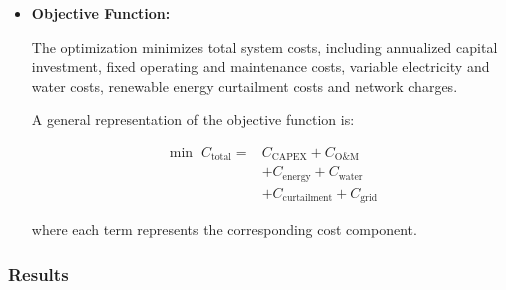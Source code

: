 \begin{itemize}
    \begin{itemize}
        \item Electrical substations.
        \item Transmission line construction and connection.
        \item Fiber-optic infrastructure.
        \item Energy generation and storage assets.
    \end{itemize}

    \item \textbf{Objective Function:}

    The optimization minimizes total system costs, including annualized capital investment, fixed operating and maintenance costs, variable electricity and water costs, renewable energy curtailment costs and network charges.

    A general representation of the objective function is:

    \[
    \begin{aligned}
        \min \; C_{\mathrm{total}} ={}&
        C_{\mathrm{CAPEX}} +
        C_{\mathrm{O\&M}} \\
        &+ C_{\mathrm{energy}} +
        C_{\mathrm{water}} \\
        &+ C_{\mathrm{curtailment}} +
        C_{\mathrm{grid}}
    \end{aligned}
    \]

    where each term represents the corresponding cost component.

\end{itemize}

\subsubsection{Results}

